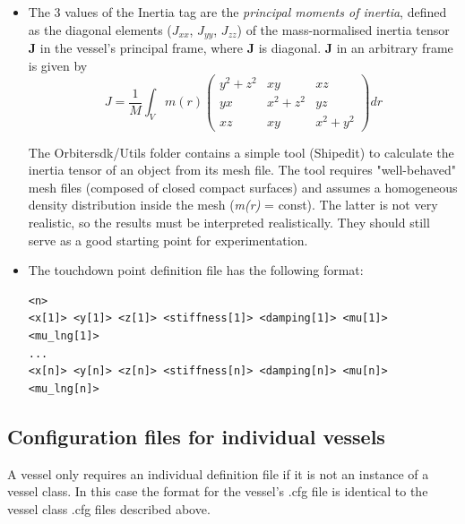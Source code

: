 \documentclass[Orbiter Developer Manual.tex]{subfiles}
\begin{document}
\begin{itemize}
\begin{lstlisting}[language=OSFS]
BEGIN_ATTACHMENT
	<Attach-spec 0>
	<Attach-spec 1>
	...
END_ATTACHMENT
\end{lstlisting}

\noindent
where each <\textit{Attach-spec i}> has the format

\begin{lstlisting}[language=OSFS,mathescape=true]
<type> <x$_{i}$> <y$_{i}$> <z$_{i}$> <dx$_{i}$> <dy$_{i}$> <dz$_{i}$> <rx$_{i}$> <ry$_{i}$> <rz$_{i}$> <id>
\end{lstlisting}

\noindent
<\textit{type}$_{i}$> is a single character: 'P' (attach to parent) or 'C' (attach to child). The next 9 entries define the attachment position and direction in the same way as docking ports. <\textit{id}$_{i}$> is a string of up to 8 characters used for defining compatibility between attachment points.

\item The 3 values of the Inertia tag are the \textit{principal moments of inertia}, defined as the diagonal elements ($J_{xx}$, $J_{yy}$, $J_{zz}$) of the mass-normalised inertia tensor \textbf{J} in the vessel's principal frame, where \textbf{J} is diagonal. \textbf{J} in an arbitrary frame is given by
\[ J = \frac{1}{M} \int_{V} m(r)  
\begin{pmatrix}
y^{2} + z^{2} & xy & xz\\
yx & x^{2} + z^{2} & yz\\
xz & xy & x^{2} + y^{2}
\end{pmatrix}
dr
\]

\noindent
The Orbitersdk/Utils folder contains a simple tool (Shipedit) to calculate the inertia tensor of an object from its mesh file. The tool requires "well-behaved" mesh files (composed of closed compact surfaces) and assumes a homogeneous density distribution inside the mesh (\textit{m(r)} = const). The latter is not very realistic, so the results must be interpreted realistically. They should still serve as a good starting point for experimentation.

\item The touchdown point definition file has the following format:
\begin{lstlisting}[language=OSFS]
<n>
<x[1]> <y[1]> <z[1]> <stiffness[1]> <damping[1]> <mu[1]> <mu_lng[1]>
...
<x[n]> <y[n]> <z[n]> <stiffness[n]> <damping[n]> <mu[n]> <mu_lng[n]>
\end{lstlisting}

\end{itemize}


\subsection{Configuration files for individual vessels}
A vessel only requires an individual definition file if it is not an instance of a vessel class. In this case the format for the vessel's .cfg file is identical to the vessel class .cfg files described above.
\end{document}
